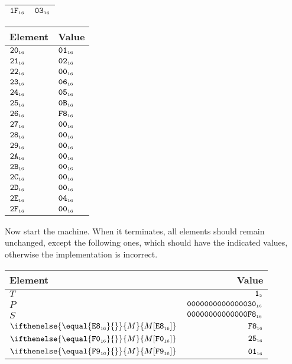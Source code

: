 \documentclass[a4paper,12pt]{article}
\newcommand{\num}[1]{\texttt{#1}}
\newcommand{\hex}[1]{\num{#1}_{\textup{\tiny 16}}}
\newcommand{\bin}[1]{\num{#1}_{\textup{\tiny 2}}}
\newcommand{\MEM}[1]{\ifthenelse{\equal{#1}{}}{M}{M[#1]}}
\newcommand{\PC}{P}
\newcommand{\SP}{S}
\newcommand{\TERM}{T}
\newcommand{\T}{\bin{1}}
\begin{document}
\begin{center}
\begin{tabular}{@{}ll@{}}
    $\hex{1F}$ & $\hex{03}$ \\
    \hline
  \end{tabular}
  \hfil
  \begin{tabular}{@{}ll@{}}
    \hline
    Element    & Value \\
    \hline
    $\hex{20}$ & $\hex{01}$ \\
    $\hex{21}$ & $\hex{02}$ \\
    $\hex{22}$ & $\hex{00}$ \\
    $\hex{23}$ & $\hex{06}$ \\
    $\hex{24}$ & $\hex{05}$ \\
    $\hex{25}$ & $\hex{0B}$ \\
    $\hex{26}$ & $\hex{F8}$ \\
    $\hex{27}$ & $\hex{00}$ \\
    $\hex{28}$ & $\hex{00}$ \\
    $\hex{29}$ & $\hex{00}$ \\
    $\hex{2A}$ & $\hex{00}$ \\
    $\hex{2B}$ & $\hex{00}$ \\
    $\hex{2C}$ & $\hex{00}$ \\
    $\hex{2D}$ & $\hex{00}$ \\
    $\hex{2E}$ & $\hex{04}$ \\
    $\hex{2F}$ & $\hex{00}$ \\
    \hline
  \end{tabular}
\end{center}

Now start the machine.
When it terminates, all elements should remain unchanged, except the following ones, which should have the indicated values, otherwise the implementation is incorrect.

\begin{center}
  \begin{tabular}{@{}lr@{}}
    \hline
    Element          & Value                     \\
    \hline
    $\TERM$          & $\T$                      \\
    $\PC$            & $\hex{0000000000000030}$ \\
    $\SP$            & $\hex{00000000000000F8}$ \\
    $\MEM{\hex{E8}}$ & $\hex{F8}$ \\
    $\MEM{\hex{F0}}$ & $\hex{25}$ \\
    $\MEM{\hex{F9}}$ & $\hex{01}$ \\
    \hline
  \end{tabular}
\end{center}
\end{document}
